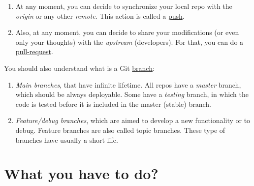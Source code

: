 \begin{enumerate}
\item At any moment, you can decide to synchronize your local repo
  with the \emph{origin} or any other \emph{remote}. This action is
  called a
  \href{https://docs.github.com/en/github/using-git/pushing-commits-to-a-remote-repository}{push}.
\item Also, at any moment, you can decide to share your modifications
  (or even only your thoughts) with the \emph{upstream}
  (developers). For that, you can do a
  \href{https://docs.github.com/en/github/collaborating-with-issues-and-pull-requests/about-pull-requests}{pull-request}.
\end{enumerate}

You should also understand what is a
Git \href{https://docs.gitlab.com/ee/topics/gitlab_flow.html}{branch}:
\begin{enumerate}
\item \emph{Main branches}, that have infinite lifetime. All repos
  have a \emph{master} branch, which should be always deployable. Some
  have a \emph{testing} branch, in which the code is tested before it
  is included in the master (stable) branch.
\item \emph{Feature/debug branches}, which are aimed to develop a new
  functionality or to debug. Feature branches are also called topic
  branches. These type of branches have usually a short life.
\end{enumerate}

\section{What you have to do?}

